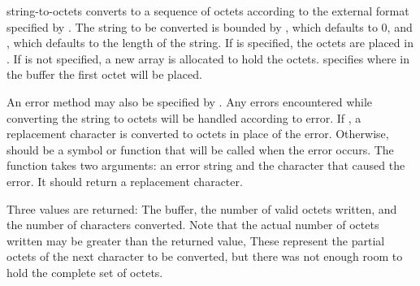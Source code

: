 \begin{defun}{}{string-to-octets}{\args {} }
   converts  to a sequence of
  octets according to the external format specified by
  .  The string to be converted is bounded by
  , which defaults to 0, and , which defaults to
  the length of the string.  If  is specified, the octets
  are placed in .  If  is not specified, a new
  array is allocated to hold the octets.   specifies
  where in the buffer the first octet will be placed.

  An error method may also be specified by .  Any errors
  encountered while converting the string to octets will be handled
  according to error.  If \nil{}, a replacement character is converted
  to octets in place of the error.  Otherwise,  should be a
  symbol or function that will be called when the error occurs.  The
  function takes two arguments:  an error string and the character
  that caused the error.  It should return a replacement character.
  
  Three values are returned: The buffer, the number of valid octets
  written, and the number of characters converted.  Note that the
  actual number of octets written may be greater than the returned
  value, These represent the partial octets of the next character to
  be converted, but there was not enough room to hold the complete set
  of octets.
\end{defun}

